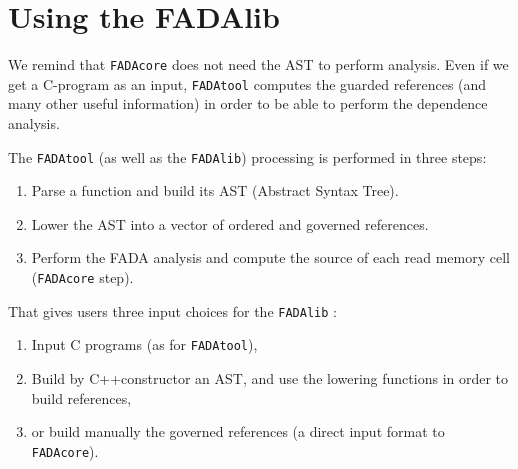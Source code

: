 \section{Using the FADAlib}
We remind that \verb|FADAcore| does not need the AST to perform analysis. Even if we get a C-program as an input, \verb|FADAtool| computes the guarded references (and many other useful information) in order to be able to perform the dependence analysis.

The \verb|FADAtool| (as well as the \verb|FADAlib|) processing is performed in three steps:
\begin{enumerate}
 \item Parse a function and build its AST (Abstract Syntax Tree).
 \item Lower the AST into a vector of ordered and governed references.
 \item Perform the FADA analysis and compute the source of each read memory cell (\verb|FADAcore| step).
\end{enumerate}



% 
% 


That gives users three input choices for the \verb|FADAlib| :
\begin{enumerate}
 \item Input C programs (as for \verb|FADAtool|),
 \item Build by C++constructor an AST, and use the lowering functions in order to build references,
 \item or build manually the governed references (a direct input format to  \verb|FADAcore|).
\end{enumerate}


